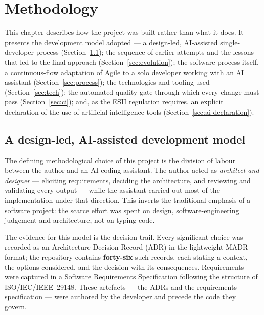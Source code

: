 \chapter{Methodology}
\label{ch:methodology}

\setlength{\emergencystretch}{3em}

This chapter describes how the project was built rather than what it does. It
presents the development model adopted --- a design-led, AI-assisted single-developer
process (Section~\ref{sec:ai-model}); the sequence of earlier attempts and the
lessons that led to the final approach (Section~\ref{sec:evolution}); the software
process itself, a continuous-flow adaptation of Agile to a solo developer working
with an AI assistant (Section~\ref{sec:process}); the technologies and tooling used
(Section~\ref{sec:tech}); the automated quality gate through which every change must
pass (Section~\ref{sec:ci}); and, as the ESII regulation requires, an explicit
declaration of the use of artificial-intelligence tools
(Section~\ref{sec:ai-declaration}).

\section{A design-led, AI-assisted development model}
\label{sec:ai-model}

The defining methodological choice of this project is the division of labour between
the author and an AI coding assistant. The author acted as \emph{architect and
designer} --- eliciting requirements, deciding the architecture, and reviewing and
validating every output --- while the assistant carried out most of the
implementation under that direction. This inverts the traditional emphasis of a
software project: the scarce effort was spent on design, software-engineering
judgement and architecture, not on typing code.

The evidence for this model is the decision trail. Every significant choice was
recorded as an Architecture Decision Record (ADR) in the lightweight MADR format;
the repository contains \textbf{forty-six} such records,
each stating a context, the options considered, and the decision with its
consequences. Requirements were captured in a Software Requirements Specification
following the structure of ISO/IEC/IEEE~29148. These artefacts ---
the ADRs and the requirements specification --- were authored by the developer and
precede the code they govern.


